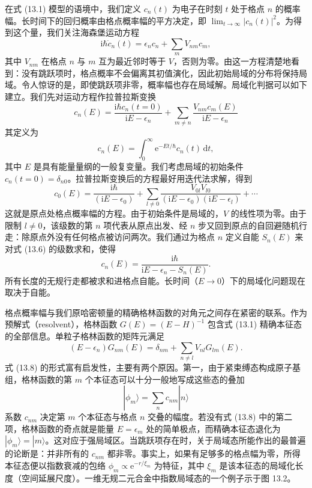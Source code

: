 在式 (13.1) 模型的语境中，我们定义 $c_{n}(t)$ 为电子在时刻 $t$ 处于格点 $n$ 的概率幅。长时间下的回归概率由格点概率幅的平方决定，即 $\lim_{t\to\infty}|c_{n}(t)|^{2}$。为得到这个量，我们关注海森堡运动方程
\begin{equation*}
\mathrm{i}\hbar\dot{c}_{n}(t)=\epsilon_{n}c_{n}+\sum_{m}V_{nm}c_{m},\tag{13.3}
\end{equation*}
其中 $V_{nm}$ 在格点 $n$ 与 $m$ 互为最近邻时等于 $V$，否则为零。由这一方程清楚地看到：没有跳跃项时，格点概率不会偏离其初值演化，因此初始局域的分布将保持局域。令人惊讶的是，即使跳跃项非零，概率幅也存在局域解。局域化判据可以如下建立。我们先对运动方程作拉普拉斯变换
\begin{equation*}
c_{n}(E)=\frac{\mathrm{i}\hbar c_{n}(t=0)}{\mathrm{i}E-\epsilon_{n}}+\sum_{m\neq n}\frac{V_{nm}c_{m}(E)}{\mathrm{i}E-\epsilon_{n}}\tag{13.4}
\end{equation*}
其定义为
\begin{equation*}
c_{n}(E)=\int_{0}^{\infty}\mathrm{e}^{-Et/\hbar}c_{n}(t)\,\mathrm{d}t,\tag{13.5}
\end{equation*}
其中 $E$ 是具有能量量纲的一般复变量。我们考虑局域的初始条件 $c_{n}(t=0)=\delta_{n0}$。拉普拉斯变换后的方程最好用迭代法求解，得到
\begin{equation*}
c_{0}(E)=\frac{\mathrm{i}\hbar}{(\mathrm{i}E-\epsilon_{0})}+\sum_{l\neq 0}\frac{V_{0l}V_{l0}}{(\mathrm{i}E-\epsilon_{0})(\mathrm{i}E-\epsilon_{l})}+\cdots\tag{13.6}
\end{equation*}
这就是原点处格点概率幅的方程。由于初始条件是局域的，$V$ 的线性项为零。由于限制 $l\neq 0$，该级数的第 $n$ 项代表从原点出发、经 $n$ 步又回到原点的自回避随机行走：除原点外没有任何格点被访问两次。我们通过为格点 $n$ 定义自能 $S_{n}(E)$ 来对式 (13.6) 的级数求和，使得
\begin{equation*}
c_{n}(E)=\frac{\mathrm{i}\hbar}{\mathrm{i}E-\epsilon_{n}-S_{n}(E)}.\tag{13.7}
\end{equation*}
所有长度的无规行走都被求和进格点自能。长时间（$E\to 0$）下的局域化问题现在取决于自能。

格点概率幅与我们原哈密顿量的精确格林函数的对角元之间存在紧密的联系。作为预解式（resolvent），格林函数 $G(E)=(E-H)^{-1}$ 包含式 (13.1) 精确本征态的全部信息。单粒子格林函数的矩阵元满足
\begin{equation*}
(E-\epsilon_{n})G_{nm}(E)=\delta_{nm}+\sum_{n\neq l}V_{nl}G_{lm}(E).\tag{13.8}
\end{equation*}
式 (13.8) 的形式富有启发性，主要有两个原因。第一，由于紧束缚态构成原子基组，格林函数的第 $m$ 个本征态可以十分一般地写成这些态的叠加
\begin{equation*}
|\phi_{m}\rangle=\sum_{n}c_{nm}|n\rangle\tag{13.9}
\end{equation*}
系数 $c_{nm}$ 决定第 $m$ 个本征态与格点 $n$ 交叠的幅度。若没有式 (13.8) 中的第二项，格林函数的奇点就是能量 $E=\epsilon_{m}$ 处的简单极点，而精确本征态退化为 $|\phi_{m}\rangle=|m\rangle$。这对应于强局域区。当跳跃项存在时，关于局域态所能作出的最普遍的论断是：并非所有的 $c_{nm}$ 都非零。事实上，如果有足够多的格点幅为零，所得本征态便以指数衰减的包络 $\phi_{m}\propto\mathrm{e}^{-r/\xi_{m}}$ 为特征，其中 $\xi_{m}$ 是该本征态的局域化长度（空间延展尺度）。一维无规二元合金中指数局域态的一个例子示于图 13.2。

